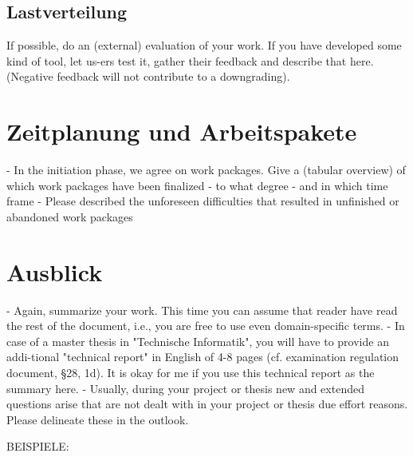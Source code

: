 \subsection{Lastverteilung}

If possible, do an (external) evaluation of your work. If you have developed some kind of tool, let us-ers test it, gather their feedback and describe that here. (Negative feedback will not contribute to a downgrading).

\section{Zeitplanung und Arbeitspakete}

- In the initiation phase, we agree on work packages. Give a (tabular overview) of which work packages have been finalized
  - to what degree
  - and in which time frame
- Please described the unforeseen difficulties that resulted in unfinished or abandoned work packages


\section{Ausblick}

- Again, summarize your work. This time you can assume that reader have read the rest of the document, i.e., you are free to use even domain-specific terms.
- In case of a master thesis in "Technische Informatik", you will have to provide an addi-tional "technical report" in English of 4-8 pages (cf. examination regulation document, §28, 1d). It is okay for me if you use this technical report as the summary here.
- Usually, during your project or thesis new and extended questions arise that are not dealt with in your project or thesis due effort reasons. Please delineate these in the outlook.

BEISPIELE:

